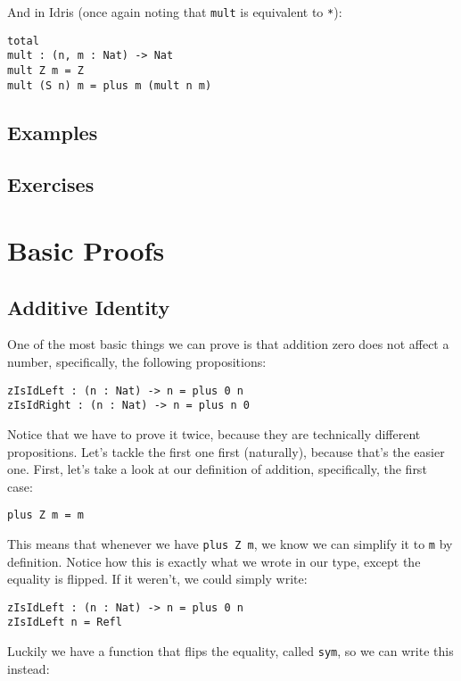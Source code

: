 \documentclass{article}
\newcommand{\inline}[1]{\texttt{#1}}
\begin{document}
And in Idris (once again noting that \inline{mult} is equivalent to \inline{*}):

\begin{verbatim}
total
mult : (n, m : Nat) -> Nat
mult Z m = Z
mult (S n) m = plus m (mult n m)
\end{verbatim}

\subsection{Examples}

\subsection{Exercises}

\section{Basic Proofs}
\subsection{Additive Identity}
One of the most basic things we can prove is that addition zero does not affect a number, specifically, the following propositions:

\begin{verbatim}
zIsIdLeft : (n : Nat) -> n = plus 0 n
zIsIdRight : (n : Nat) -> n = plus n 0
\end{verbatim}

Notice that we have to prove it twice, because they are technically different propositions.
Let's tackle the first one first (naturally), because that's the easier one.
First, let's take a look at our definition of addition, specifically, the first case:

\begin{verbatim}
plus Z m = m
\end{verbatim}

This means that whenever we have \inline{plus Z m}, we know we can simplify it to \inline{m} by definition.
Notice how this is exactly what we wrote in our type, except the equality is flipped.
If it weren't, we could simply write:

\begin{verbatim}
zIsIdLeft : (n : Nat) -> n = plus 0 n
zIsIdLeft n = Refl
\end{verbatim}

Luckily we have a function that flips the equality, called \inline{sym}, so we can write this instead:
\end{document}
